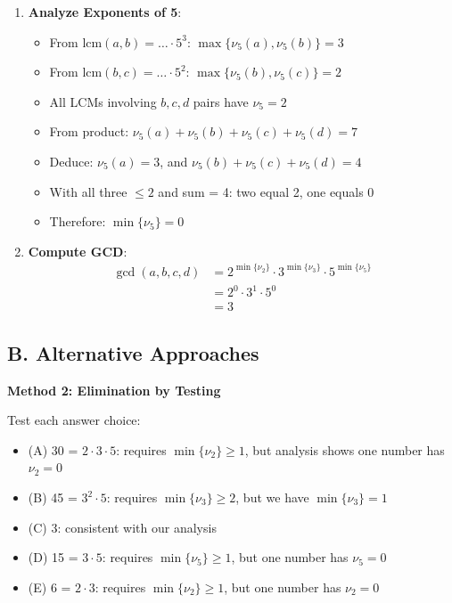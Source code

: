 \documentclass[12pt]{article}
\begin{document}
\begin{solutionbox}
\begin{enumerate}[leftmargin=*]
    \item \textbf{Analyze Exponents of 5}: 
    \begin{itemize}
        \item From $\text{lcm}(a,b) = \ldots \cdot 5^3$: $\max\{\nu_5(a), \nu_5(b)\} = 3$
        \item From $\text{lcm}(b,c) = \ldots \cdot 5^2$: $\max\{\nu_5(b), \nu_5(c)\} = 2$
        \item All LCMs involving $b,c,d$ pairs have $\nu_5 = 2$
        \item From product: $\nu_5(a) + \nu_5(b) + \nu_5(c) + \nu_5(d) = 7$
        \item Deduce: $\nu_5(a) = 3$, and $\nu_5(b) + \nu_5(c) + \nu_5(d) = 4$
        \item With all three $\leq 2$ and sum = 4: two equal 2, one equals 0
        \item Therefore: $\min\{\nu_5\} = 0$
    \end{itemize}
    
    \item \textbf{Compute GCD}: 
    \begin{align*}
    \gcd(a,b,c,d) &= 2^{\min\{\nu_2\}} \cdot 3^{\min\{\nu_3\}} \cdot 5^{\min\{\nu_5\}}\\
    &= 2^0 \cdot 3^1 \cdot 5^0\\
    &= 3
    \end{align*}
\end{enumerate}

\subsection*{B. Alternative Approaches}

\textbf{Method 2: Elimination by Testing}

Test each answer choice:
\begin{itemize}
    \item (A) 30 = $2 \cdot 3 \cdot 5$: requires $\min\{\nu_2\} \geq 1$, but analysis shows one number has $\nu_2 = 0$
    \item (B) 45 = $3^2 \cdot 5$: requires $\min\{\nu_3\} \geq 2$, but we have $\min\{\nu_3\} = 1$
    \item (C) 3: consistent with our analysis \checkmark
    \item (D) 15 = $3 \cdot 5$: requires $\min\{\nu_5\} \geq 1$, but one number has $\nu_5 = 0$
    \item (E) 6 = $2 \cdot 3$: requires $\min\{\nu_2\} \geq 1$, but one number has $\nu_2 = 0$
\end{itemize}

\end{solutionbox}
\end{document}
